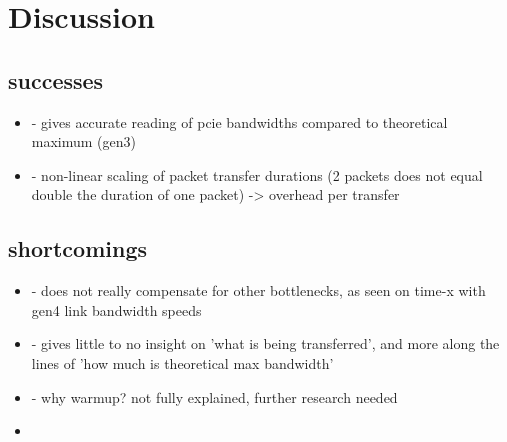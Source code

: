 \section{Discussion}

\subsection{successes}
\begin{itemize}
	\item - gives accurate reading of pcie bandwidths compared to theoretical maximum (gen3)
	\item - non-linear scaling of packet transfer durations (2 packets does not equal double the duration of one packet) -> overhead per transfer
\end{itemize}


\subsection{shortcomings}
\begin{itemize}
	\item - does not really compensate for other bottlenecks, as seen on time-x with gen4 link bandwidth speeds
	\item - gives little to no insight on 'what is being transferred', and more along the lines of 'how much is theoretical max bandwidth'
	\item - why warmup? not fully explained, further research needed
	\item 
\end{itemize}

